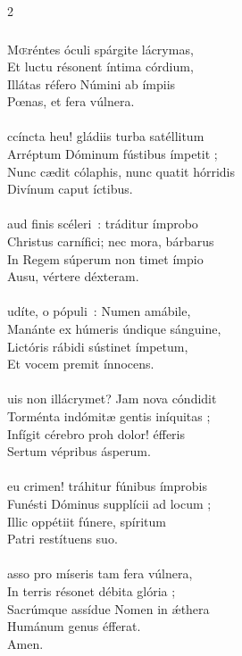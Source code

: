 \documentclass[9pt,twoside]{extarticle}
\begin{document}
\begin{multicols}{2}
{{\subsubsection*{\center {}}
\lettrine{M}œréntes óculi spárgite lácrymas,\\
Et luctu résonent íntima córdium,\\
Illátas réfero Númini ab ímpiis\\
Pœnas, et fera vúlnera.\\
\\
ccíncta heu! gládiis turba satéllitum\\
Arréptum Dóminum fústibus ímpetit ;\\
Nunc cædit cólaphis, nunc quatit hórridis\\
Divínum caput íctibus.\\
\\
aud finis scéleri~: tráditur ímprobo\\
Christus carnífici; nec mora, bárbarus\\
In Regem súperum non timet ímpio\\
Ausu, vértere déxteram.\\
\\
udíte, o pópuli~: Numen amábile,\\
Manánte ex húmeris úndique sánguine,\\
Lictóris rábidi sústinet ímpetum,\\
Et vocem premit ínnocens.\\
\\
uis non illácrymet? Jam nova cóndidit\\
Torménta indómitæ gentis iníquitas ;\\
Infígit cérebro proh dolor! éfferis\\
Sertum vépribus ásperum.\\
\\
eu crimen! tráhitur fúnibus ímprobis\\
Funésti Dóminus supplícii ad locum ;\\
Illic oppétiit fúnere, spíritum\\
Patri restítuens suo.\\
\\
asso pro míseris tam fera vúlnera,\\
In terris résonet débita glória ;\\
Sacrúmque assídue Nomen in ǽthera\\
Humánum genus éfferat.\\
Amen.

}}
\end{multicols}
\end{document}
